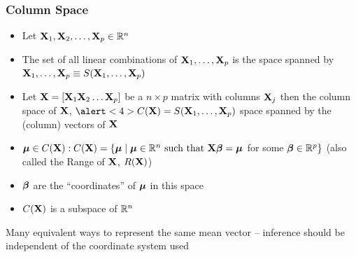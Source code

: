 \documentclass{beamer}
\begin{document}
\begin{frame}
  \frametitle{Column Space}
\begin{itemize}
\item Let $\mathbf{X}_1, \mathbf{X}_2,\ldots, \mathbf{X}_p \in \mathbb{R}^n$  \pause
\item The set of all linear combinations of $\mathbf{X}_1, \ldots, \mathbf{X}_p$ is
  the space spanned by $\mathbf{X}_1, \ldots, \mathbf{X}_p \equiv S(\mathbf{X}_1, \ldots,
  \mathbf{X}_p)$  \pause
\item Let $\mathbf{X} = [ \mathbf{X}_1\mathbf{X}_2 \ldots \mathbf{X}_p]$ be a $n \times p$ matrix with
  columns $\mathbf{X}_j$ then the column space of $\mathbf{X}$, $\alert<4>{C(\X) = S(\X_1, \ldots,
  \X_p)}$ space spanned by the (column) vectors of $\mathbf{X}$ \pause
\item $\boldsymbol{\mu} \in C(\mathbf{X}): C(\mathbf{X}) = \{\boldsymbol{\mu} \mid \boldsymbol{\mu} \in \mathbb{R}^n \text{ such
    that } \mathbf{X} \boldsymbol{\beta} =
    \boldsymbol{\mu} $ for some $\boldsymbol{\beta} \in \mathbb{R}^p\}$  (also called the Range of $\mathbf{X}$,
    $R(\mathbf{X})$) \pause
\item $\boldsymbol{\beta}$ are the ``coordinates'' of $\boldsymbol{\mu}$  in this space \pause
\item $C(\mathbf{X})$ is a subspace of $\mathbb{R}^n$
\end{itemize}
Many equivalent ways to represent the same mean vector -- inference
should be independent of the coordinate system used \pause

\end{frame}
\end{document}
